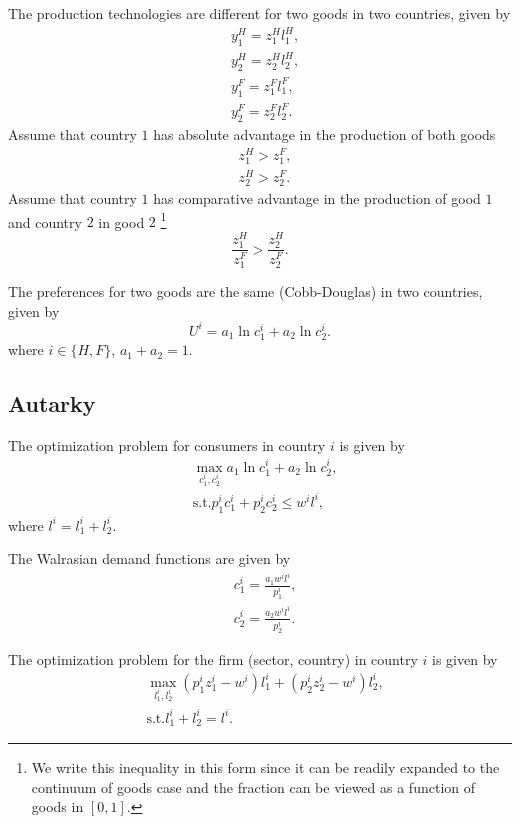 \documentclass[fontset=windows]{article}
\numberwithin{equation}{section}
\numberwithin{figure}{section}
\theoremstyle{plain}
\numberwithin{theorem}{section}
\numberwithin{lemma}{section}
\numberwithin{corollary}{section}
\numberwithin{definition}{section}
\numberwithin{proposition}{section}
\numberwithin{example}{section}
\numberwithin{assumption}{section}
\begin{document}
The production technologies are different for two goods in two countries, given by 
\begin{align*}
    & y^H_1 = z^H_1 l^H_1, \\
    & y^H_2 = z^H_2 l^H_2, \\ 
    & y^F_1 = z^F_1 l^F_1, \\ 
    & y^F_2 = z^F_2 l^F_2. 
\end{align*}
Assume that country $1$ has absolute advantage in the production of both goods 
\begin{align*}
    & z^H_1 > z^F_1, \\ 
    & z^H_2 > z^F_2. 
\end{align*}
Assume that country $1$ has comparative advantage in the production of good $1$ and country $2$ in good $2$ \footnote{We write this inequality in this form since it can be readily expanded to the continuum of goods case and the fraction can be viewed as a function of goods in $[0, 1]$.} 
\begin{equation*}
    \frac{z^H_1}{z^F_1} > \frac{z^H_2}{z^F_2}. 
\end{equation*}

The preferences for two goods are the same (Cobb-Douglas) in two countries, given by 
\begin{equation*}
    U^i = a_1 \ln c^i_1 + a_2 \ln c^i_2. 
\end{equation*}
where $i\in\{H,F\}$, $a_1 + a_2 = 1$. 

\subsection{Autarky} 
\noindent The optimization problem for consumers in country $i$ is given by 
\begin{align*}
    & \max_{c^i_1, c^i_2} a_1 \ln c^i_1 + a_2 \ln c^i_2, \\ 
    & \mathrm{s.t.} p^i_1 c^i_1 + p^i_2 c^i_2 \leq w^i l^i, 
\end{align*}
where $l^i = l^i_1 + l^i_2$. 

The Walrasian demand functions are given by 
\begin{align}
    & c^i_1 = \frac{a_1 w^i l^i}{p^i_1}, \label{eq.rd1} \\ 
    & c^i_2 = \frac{a_2 w^i l^i}{p^i_2}. \label{eq.rd2}
\end{align}

The optimization problem for the firm (sector, country) in country $i$ is given by 
\begin{align*}
    & \max_{l^i_1, l^i_2} (p^i_1 z^i_1 - w^i) l^i_1 + (p^i_2 z^i_2 - w^i) l^i_2, \\ 
    & \mathrm{s.t.} l^i_1 + l^i_2 = l^i. 
\end{align*}
\end{document}
